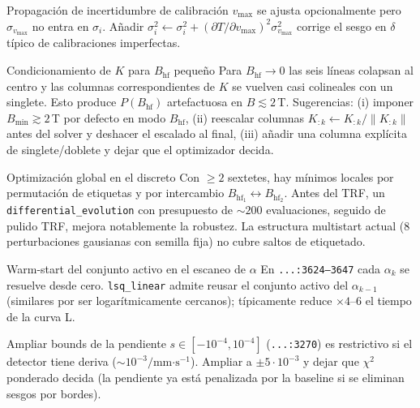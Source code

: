\documentclass[11pt,a4paper]{article}
\newcommand{\BHF}{B_{\mathrm{hf}}}
\newcommand{\code}[1]{\texttt{\small #1}}
\newcommand{\file}[1]{\textcolor{black!70}{\texttt{\small #1}}}
\begin{document}
\begin{mejora}{Propagación de incertidumbre de calibración}\label{mej:vmax}
$v_{\max}$ se ajusta opcionalmente pero $\sigma_{v_{\max}}$ no entra en $\sigma_i$. Añadir
\(\sigma_i^{2}\leftarrow \sigma_i^{2}+(\partial T/\partial v_{\max})^{2}\sigma_{v_{\max}}^{2}\) corrige el sesgo en $\delta$ típico de calibraciones imperfectas.
\end{mejora}

\begin{mejora}{Condicionamiento de $K$ para $\BHF$ pequeño}\label{mej:cond}
Para $\BHF\to 0$ las seis líneas colapsan al centro y las columnas correspondientes de $K$ se vuelven casi colineales con un singlete. Esto produce $P(\BHF)$ artefactuosa en $B\lesssim 2\,$T. Sugerencias: (i) imponer $B_{\min}\gtrsim 2\,$T por defecto en modo $\BHF$, (ii) reescalar columnas $K_{:k}\leftarrow K_{:k}/\|K_{:k}\|$ antes del solver y deshacer el escalado al final, (iii) añadir una columna explícita de singlete/doblete y dejar que el optimizador decida.
\end{mejora}

\begin{mejora}{Optimización global en el discreto}\label{mej:global}
Con $\ge 2$ sextetes, hay mínimos locales por permutación de etiquetas y por intercambio $\BHF_1\leftrightarrow\BHF_2$. Antes del TRF, un \code{differential\_evolution} con presupuesto de $\sim 200$ evaluaciones, seguido de pulido TRF, mejora notablemente la robustez. La estructura multistart actual (8 perturbaciones gausianas con semilla fija) no cubre saltos de etiquetado.
\end{mejora}

\begin{mejora}{Warm-start del conjunto activo en el escaneo de $\alpha$}\label{mej:warm}
En \file{...:3624--3647} cada $\alpha_k$ se resuelve desde cero. \code{lsq\_linear} admite reusar el conjunto activo del $\alpha_{k-1}$ (similares por ser logarítmicamente cercanos); típicamente reduce $\times 4$--$6$ el tiempo de la curva L.
\end{mejora}

\begin{mejora}{Ampliar bounds de la pendiente}\label{mej:slope}
$s\in[-10^{-4},10^{-4}]$ (\file{...:3270}) es restrictivo si el detector tiene deriva ($\sim 10^{-3}/\text{mm·s}^{-1}$). Ampliar a $\pm 5\cdot 10^{-3}$ y dejar que $\chi^{2}$ ponderado decida (la pendiente ya está penalizada por la baseline si se eliminan sesgos por bordes).
\end{mejora}
\end{document}
